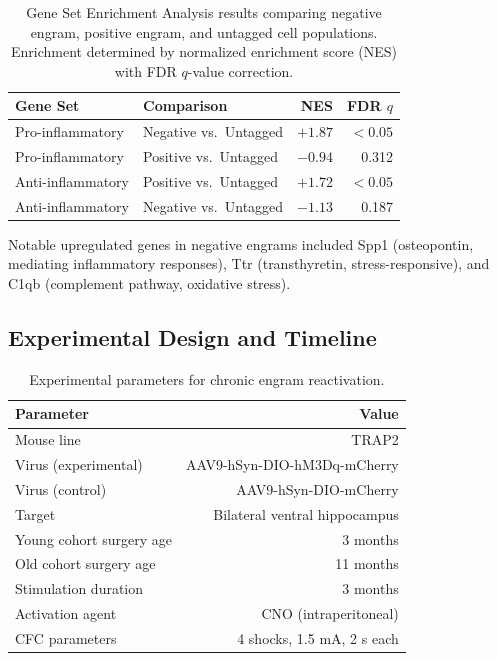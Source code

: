 \documentclass[11pt]{article}
\begin{document}
\begin{table}[H]
\centering
\caption{Gene Set Enrichment Analysis results comparing negative engram, positive engram, and untagged cell populations. Enrichment determined by normalized enrichment score (NES) with FDR $q$-value correction.}
\label{tab:gsea}
\begin{tabular}{llrr}
\toprule
\textbf{Gene Set} & \textbf{Comparison} & \textbf{NES} & \textbf{FDR $q$} \\
\midrule
Pro-inflammatory & Negative vs.\ Untagged & $+1.87$ & $<0.05$ \\
Pro-inflammatory & Positive vs.\ Untagged & $-0.94$ & 0.312 \\
Anti-inflammatory & Positive vs.\ Untagged & $+1.72$ & $<0.05$ \\
Anti-inflammatory & Negative vs.\ Untagged & $-1.13$ & 0.187 \\
\bottomrule
\end{tabular}
\end{table}

Notable upregulated genes in negative engrams included Spp1 (osteopontin, mediating inflammatory responses), Ttr (transthyretin, stress-responsive), and C1qb (complement pathway, oxidative stress).

\subsection{Experimental Design and Timeline}

\begin{table}[H]
\centering
\caption{Experimental parameters for chronic engram reactivation.}
\label{tab:design}
\begin{tabular}{lr}
\toprule
\textbf{Parameter} & \textbf{Value} \\
\midrule
Mouse line & TRAP2 \\
Virus (experimental) & AAV9-hSyn-DIO-hM3Dq-mCherry \\
Virus (control) & AAV9-hSyn-DIO-mCherry \\
Target & Bilateral ventral hippocampus \\
Young cohort surgery age & 3 months \\
Old cohort surgery age & 11 months \\
Stimulation duration & 3 months \\
Activation agent & CNO (intraperitoneal) \\
CFC parameters & 4 shocks, 1.5 mA, 2 s each \\
\bottomrule
\end{tabular}
\end{table}
\end{document}
